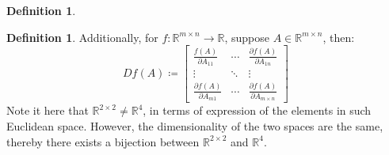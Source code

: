\documentclass[12pt]{article}
\newcommand{\R}{{\mathbb R}}
\theoremstyle{definition}
\newtheorem{definition}[theorem]{Definition}
\theoremstyle{plain}
\begin{document}
\begin{definition}
\begin{definition}
        Additionally, for $f: \R^{m \times n} \to \R$, suppose $A \in \R^{m
        \times n}$, then:
        \[
            D f(A) \coloneqq
            \begin{bmatrix}
                \frac{f(A)}{\partial A_{11}} & \cdots & \frac{\partial
                f(A)}{\partial A_{1n}} \\
                \vdots & \ddots & \vdots \\
                \frac{\partial f(A)}{\partial A_{m1}} & \cdots &
                \frac{\partial f(A)}{\partial A_{m\times n}}
            \end{bmatrix}
        \]
        Note it here that $\R^{2\times 2}\not= \R^4$, in terms of expression of
        the elements in such Euclidean space. However, the dimensionality of the
        two spaces are the same, thereby there exists a bijection between
        $\R^{2\times 2}$ and $\R^4$.
    \end{definition}
\end{definition}
\end{document}
